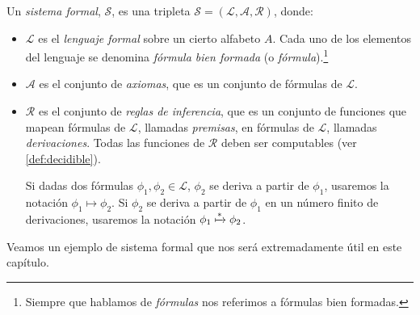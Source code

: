 \begin{definicion}\label{def:sistema-formal}
Un \emph{sistema formal}, $\mathcal{S}$, es una tripleta $\mathcal{S} = (\mathcal{L}, \mathcal{A}, \mathcal{R})$, donde:
\begin{itemize}
    \item $\mathcal{L}$ es el \emph{lenguaje formal} sobre un cierto alfabeto $A$. Cada uno de los elementos del lenguaje se denomina \emph{fórmula bien formada} (o \emph{fórmula}).\footnote{Siempre que hablamos de \emph{fórmulas} nos referimos a fórmulas bien formadas.}
    \item $\mathcal{A}$ es el conjunto de \emph{axiomas}, que es un conjunto de fórmulas de $\mathcal{L}$.
    \item $\mathcal{R}$ es el conjunto de \emph{reglas de inferencia}, que es un conjunto de funciones que mapean fórmulas de $\mathcal{L}$, llamadas \emph{premisas}, en fórmulas de $\mathcal{L}$, llamadas \emph{derivaciones}. Todas las funciones de $\mathcal{R}$ deben ser computables (ver \cref{def:decidible}).

    Si dadas dos fórmulas $\phi_1, \phi_2\in\mathcal{L}$, $\phi_2$ se deriva a partir de $\phi_1$, usaremos la notación $\phi_1 \mapsto \phi_2$. Si $\phi_2$ se deriva a partir de $\phi_1$ en un número finito de derivaciones, usaremos la notación $\phi_1 \xmapsto{*}\phi_2$.
\end{itemize}
\end{definicion}

Veamos un ejemplo de sistema formal que nos será extremadamente útil en este capítulo.

